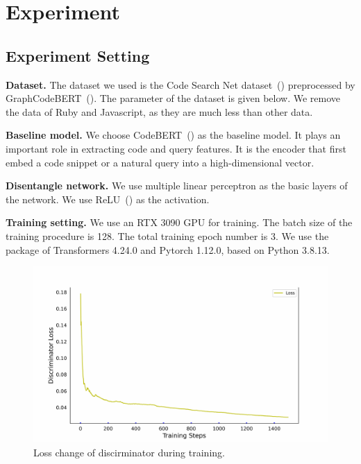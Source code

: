 
\section{Experiment}
\label{sec:exp}

\subsection{Experiment Setting}
\noindent\textbf{Dataset.} The dataset we used is the Code Search Net dataset~(\citealp{CodeSearchNet}) 
preprocessed by GraphCodeBERT~(\citealp{GraphCodeBERT}). 
The parameter of the dataset is given below. We remove the data of Ruby and Javascript, 
as they are much less than other data. 

\noindent\textbf{Baseline model.} We choose CodeBERT~(\citealp{CodeBERT}) as the baseline model. 
It plays an important role in extracting code and query features. 
It is the encoder that first embed a code snippet or a natural query into a high-dimensional vector. 

\noindent\textbf{Disentangle network.} We use multiple linear perceptron as the basic 
layers of the network. We use ReLU~(\citealp{agarap2018deep}) as the activation. 

\noindent\textbf{Training setting.} We use an RTX 3090 GPU for training. 
The batch size of the training procedure is 128. The total training epoch number is 3. 
We use the package of Transformers 4.24.0 and Pytorch 1.12.0, based on Python 3.8.13.

\begin{figure}[htb]
	\centering
	\includegraphics[width=0.8\linewidth]{imgs/discri_loss.pdf}
	\caption{Loss change of discirminator during training.}
	\label{fig:disloss}
\end{figure}

